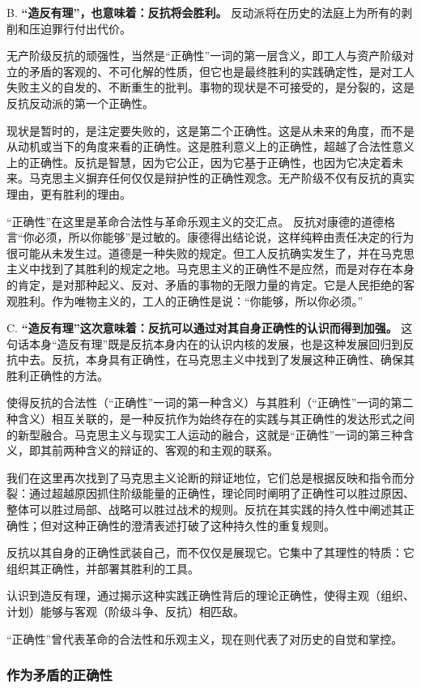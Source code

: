 \documentclass[fontset=fandol, a4paper, 12pt, twoside]{ctexart}
\begin{document}
B. \textbf{“造反有理”，也意味着：反抗将会胜利。} 反动派将在历史的法庭上为所有的剥削和压迫罪行付出代价。

无产阶级反抗的顽强性，当然是“正确性”一词的第一层含义，即工人与资产阶级对立的矛盾的客观的、不可化解的性质，但它也是最终胜利的实践确定性，是对工人失败主义的自发的、不断重生的批判。事物的现状是不可接受的，是分裂的，这是反抗反动派的第一个正确性。

现状是暂时的，是注定要失败的，这是第二个正确性。这是从未来的角度，而不是从动机或当下的角度来看的正确性。这是胜利意义上的正确性，超越了合法性意义上的正确性。反抗是智慧，因为它公正，因为它基于正确性，也因为它决定着未来。马克思主义摒弃任何仅仅是辩护性的正确性观念。无产阶级不仅有反抗的真实理由，更有胜利的理由。

“正确性”在这里是革命合法性与革命乐观主义的交汇点。
反抗对康德的道德格言“你必须，所以你能够”是过敏的。康德得出结论说，这样纯粹由责任决定的行为很可能从未发生过。道德是一种失败的规定。但工人反抗确实发生了，并在马克思主义中找到了其胜利的规定之地。马克思主义的正确性不是应然，而是对存在本身的肯定，是对那种起义、反对、矛盾的事物的无限力量的肯定。它是人民拒绝的客观胜利。作为唯物主义的，工人的正确性是说：“你能够，所以你必须。”

C. \textbf{“造反有理”这次意味着：反抗可以通过对其自身正确性的认识而得到加强。} 这句话本身“造反有理”既是反抗本身内在的认识内核的发展，也是这种发展回归到反抗中去。反抗，本身具有正确性，在马克思主义中找到了发展这种正确性、确保其胜利正确性的方法。

使得反抗的合法性（“正确性”一词的第一种含义）与其胜利（“正确性”一词的第二种含义）相互关联的，是一种反抗作为始终存在的实践与其正确性的发达形式之间的新型融合。马克思主义与现实工人运动的融合，这就是“正确性”一词的第三种含义，即其前两种含义的辩证的、客观的和主观的联系。

我们在这里再次找到了马克思主义论断的辩证地位，它们总是根据反映和指令而分裂：通过超越原因抓住阶级能量的正确性，理论同时阐明了正确性可以胜过原因、整体可以胜过局部、战略可以胜过战术的规则。反抗在其实践的持久性中阐述其正确性；但对这种正确性的澄清表述打破了这种持久性的重复规则。

反抗以其自身的正确性武装自己，而不仅仅是展现它。它集中了其理性的特质：它组织其正确性，并部署其胜利的工具。

认识到造反有理，通过揭示这种实践正确性背后的理论正确性，使得主观（组织、计划）能够与客观（阶级斗争、反抗）相匹敌。

“正确性”曾代表革命的合法性和乐观主义，现在则代表了对历史的自觉和掌控。

\subsubsection*{作为矛盾的正确性}
\end{document}
